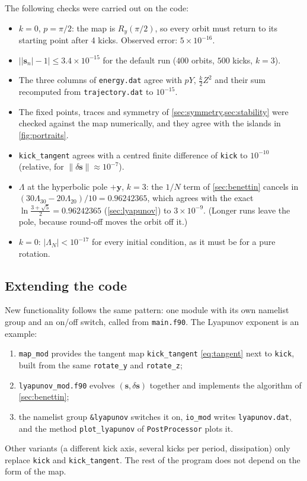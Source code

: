 \documentclass[11pt,a4paper]{article}
\newcommand{\vs}{\bm{s}}
\begin{document}
The following checks were carried out on the code:
\begin{itemize}
  \item $k = 0$, $p = \pi/2$: the map is $R_y(\pi/2)$, so every orbit must return to its starting point after 4 kicks.
  Observed error: $5\times10^{-16}$.
  \item $\big||\vs_n| - 1\big| \le 3.4\times10^{-15}$ for the default run ($400$ orbits, $500$ kicks, $k=3$).
  \item The three columns of \texttt{energy.dat} agree with $pY$, $\frac k2 Z^2$ and their sum recomputed from
  \texttt{trajectory.dat} to $10^{-15}$.
  \item The fixed points, traces and symmetry of \cref{sec:symmetry,sec:stability} were checked against the map
  numerically, and they agree with the islands in \cref{fig:portraits}.
  \item \texttt{kick\_tangent} agrees with a centred finite difference of \texttt{kick} to $10^{-10}$ (relative, for
  $\|\delta\vs\| \approx 10^{-7}$).
  \item $\Lambda$ at the hyperbolic pole $+\hat{\bm y}$, $k = 3$: the $1/N$ term of \cref{sec:benettin} cancels in
  $(30\Lambda_{30} - 20\Lambda_{20})/10 = 0.96242365$, which agrees with the exact $\ln\frac{3+\sqrt5}{2} =
  0.96242365$ (\cref{sec:lyapunov}) to $3\times10^{-9}$. (Longer runs leave the pole, because round-off moves the orbit
  off it.)
  \item $k = 0$: $|\Lambda_N| < 10^{-17}$ for every initial condition, as it must be for a pure rotation.
\end{itemize}

\subsection{Extending the code}\label{sec:extend}

New functionality follows the same pattern: one module with its own namelist group and an on/off switch, called from
\texttt{main.f90}. The Lyapunov exponent is an example:
\begin{enumerate}
  \item \texttt{map\_mod} provides the tangent map \texttt{kick\_tangent} \eqref{eq:tangent} next to \texttt{kick},
  built from the same \texttt{rotate\_y} and \texttt{rotate\_z};
  \item \texttt{lyapunov\_mod.f90} evolves $(\vs, \delta\vs)$ together and implements the algorithm of
  \cref{sec:benettin};
  \item the namelist group \texttt{\&lyapunov} switches it on, \texttt{io\_mod} writes \texttt{lyapunov.dat}, and the
  method \texttt{plot\_lyapunov} of \texttt{PostProcessor} plots it.
\end{enumerate}
Other variants (a different kick axis, several kicks per period, dissipation) only replace \texttt{kick} and
\texttt{kick\_tangent}. The rest of the program does not depend on the form of the map.
\end{document}
